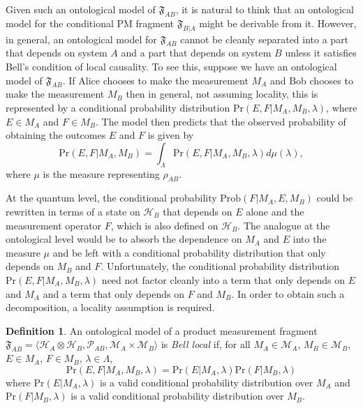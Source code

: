 \documentclass[DIV=calc,paper=a4,fontsize=11pt,twocolumn]{scrartcl} %
\theoremstyle{definition}
\newtheorem{definition}{Definition}[section]
\theoremstyle{plain}
\newcommand{\Hilb}[1][]{\ensuremath{\mathcal{H}_{#1}}}
\begin{document}
Given such an ontological model of $\mathfrak{F}_{AB}$, it is natural
to think that an ontological model for the conditional PM fragment
$\mathfrak{F}_{B|A}$ might be derivable from it.  However, in general,
an ontological model for $\mathfrak{F}_{AB}$ cannot be cleanly
separated into a part that depends on system $A$ and a part that
depends on system $B$ unless it satisfies Bell's condition of local
causality.  To see this, suppose we have an ontological model of
$\mathfrak{F}_{AB}$.  If Alice chooses to make the measurement $M_A$
and Bob chooses to make the measurement $M_B$ then in general, not
assuming locality, this is represented by a conditional probability
distribution $\text{Pr}(E, F|M_A,M_B,\lambda)$, where $E \in M_A$
and $F \in M_B$.  The model then predicts that the observed
probability of obtaining the outcomes $E$ and $F$ is given by
\begin{equation}
\text{Pr}(E,F|M_A,M_B) = \int_{\Lambda}
\text{Pr}(E,F|M_A,M_B,\lambda) d\mu(\lambda), \label{eq:Bell:ontjoint}
\end{equation}
where $\mu$ is the measure representing $\rho_{AB}$.

At the quantum level, the conditional probability
$\text{Prob}(F|M_A,E,M_B)$ could be rewritten in terms of a state on
$\Hilb[B]$ that depends on $E$ alone and the measurement operator $F$,
which is also defined on $\Hilb[B]$.  The analogue at the ontological
level would be to absorb the dependence on $M_A$ and $E$ into the
measure $\mu$ and be left with a conditional probability distribution
that only depends on $M_B$ and $F$.  Unfortunately, the conditional
probability distribution $\text{Pr}(E, F | M_A,M_B,\lambda)$ need not
factor cleanly into a term that only depends on $E$ and $M_A$ and a
term that only depends on $F$ and $M_B$.  In order to obtain such a
decomposition, a locality assumption is required.

\begin{definition}
An ontological model of a product measurement fragment
$\mathfrak{F}_{AB} = \langle \Hilb[A] \otimes \Hilb[B],
\mathcal{P}_{AB}, \mathcal{M}_A \times \mathcal{M}_B \rangle$ is
\emph{Bell local} if, for all $M_A \in \mathcal{M}_A$, $M_B \in
\mathcal{M}_B$, $E \in M_A$, $F \in M_B$, $\lambda \in \Lambda$,
\begin{equation}
\label{eq:Bell:local}
\text{Pr}(E,F|M_A,M_B,\lambda) =
\text{Pr}(E|M_A,\lambda)\text{Pr}(F|M_B,\lambda)
\end{equation}
where $\text{Pr}(E|M_A,\lambda)$ is a valid conditional
probability distribution over $M_A$ and $\text{Pr}(F|M_B,\lambda)$
is a valid conditional probability distribution over $M_B$.
\end{definition}
\end{document}
